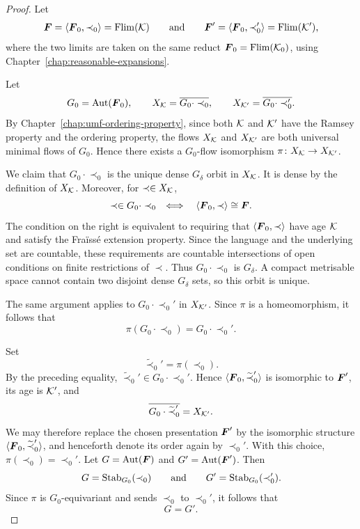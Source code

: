 \begin{proof}
    Let
    \[
        \boldsymbol{F}=\langle \boldsymbol{F}_0,\prec_0\rangle=\operatorname{Flim}(\mathcal{K})
        \qquad\text{and}\qquad
        \boldsymbol{F}'=\langle \boldsymbol{F}_0,\prec_0'\rangle=\operatorname{Flim}(\mathcal{K}'),
    \]
    where the two limits are taken on the same reduct \(\boldsymbol{F}_0=\operatorname{Flim}(\mathcal{K}_0)\), using Chapter~\ref{chap:reasonable-expansions}.

    Let
    \[
        G_0=\operatorname{Aut}(\boldsymbol{F}_0),
        \qquad
        X_{\mathcal{K}}=\overline{G_0\cdot \prec_0},
        \qquad
        X_{\mathcal{K}'}=\overline{G_0\cdot \prec_0'}.
    \]
    By Chapter~\ref{chap:umf-ordering-property}, since both \(\mathcal{K}\) and \(\mathcal{K}'\) have the Ramsey property and the
    ordering property, the flows \(X_{\mathcal{K}}\) and \(X_{\mathcal{K}'}\) are both universal
    minimal flows of \(G_0\). Hence there exists a \(G_0\)-flow isomorphism
    \(\pi\colon X_{\mathcal{K}}\to X_{\mathcal{K}'}\).

    We claim that \(G_0\cdot\prec_0\) is the unique dense
    \(G_\delta\) orbit in \(X_{\mathcal{K}}\). It is dense by the definition of
    \(X_{\mathcal{K}}\). Moreover, for \(\prec\in X_{\mathcal{K}}\),
    \[
        \prec\in G_0\cdot\prec_0
        \quad\Longleftrightarrow\quad
        \langle\boldsymbol{F}_0,\prec\rangle\cong\boldsymbol{F}.
    \]
    The condition on the right is equivalent to requiring that
    \(\langle\boldsymbol{F}_0,\prec\rangle\) have age \(\mathcal{K}\) and satisfy the
    Fraïssé extension property. Since the language and the underlying set
    are countable, these requirements are countable intersections of open
    conditions on finite restrictions of \(\prec\). Thus
    \(G_0\cdot\prec_0\) is \(G_\delta\). A compact metrisable space cannot
    contain two disjoint dense \(G_\delta\) sets, so this orbit is unique.

    The same argument applies to \(G_0\cdot\prec_0'\) in \(X_{\mathcal{K}'}\).
    Since \(\pi\) is a homeomorphism, it follows that
    \[
        \pi(G_0\cdot\prec_0)=G_0\cdot\prec_0'.
    \]

    Set
    \[
        \widetilde{\prec}_0'=\pi(\prec_0).
    \]
    By the preceding equality, \(\widetilde{\prec}_0'\in G_0\cdot\prec_0'\).
    Hence \(\langle\boldsymbol{F}_0,\widetilde{\prec}_0'\rangle\) is isomorphic to
    \(\boldsymbol{F}'\), its age is \(\mathcal{K}'\), and
    \[
        \overline{G_0\cdot\widetilde{\prec}_0'}=X_{\mathcal{K}'}.
    \]
    We may therefore replace the chosen presentation \(\boldsymbol{F}'\) by the
    isomorphic structure \(\langle\boldsymbol{F}_0,\widetilde{\prec}_0'\rangle\), and
    henceforth denote its order again by \(\prec_0'\). With this choice,
    \(\pi(\prec_0)=\prec_0'\). Let
    \(G=\operatorname{Aut}(\boldsymbol{F})\) and \(G'=\operatorname{Aut}(\boldsymbol{F}')\).
    Then
    \[
        G=\operatorname{Stab}_{G_0}(\prec_0)
        \qquad\text{and}\qquad
        G'=\operatorname{Stab}_{G_0}(\prec_0').
    \]
    Since \(\pi\) is \(G_0\)-equivariant and sends \(\prec_0\) to \(\prec_0'\), it follows that
    \[
        G=G'.
    \]


\end{proof}
